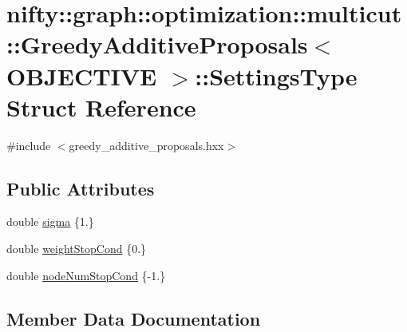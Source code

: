 \hypertarget{structnifty_1_1graph_1_1optimization_1_1multicut_1_1GreedyAdditiveProposals_1_1SettingsType}{}\section{nifty\+:\+:graph\+:\+:optimization\+:\+:multicut\+:\+:Greedy\+Additive\+Proposals$<$ O\+B\+J\+E\+C\+T\+I\+V\+E $>$\+:\+:Settings\+Type Struct Reference}
\label{structnifty_1_1graph_1_1optimization_1_1multicut_1_1GreedyAdditiveProposals_1_1SettingsType}


{\ttfamily \#include $<$greedy\+\_\+additive\+\_\+proposals.\+hxx$>$}

\subsection*{Public Attributes}
\begin{DoxyCompactItemize}
\item 
double \hyperlink{structnifty_1_1graph_1_1optimization_1_1multicut_1_1GreedyAdditiveProposals_1_1SettingsType_ac9d869a5abb42f4d2ca8a225ff7ca108}{sigma} \{1.\}
\item 
double \hyperlink{structnifty_1_1graph_1_1optimization_1_1multicut_1_1GreedyAdditiveProposals_1_1SettingsType_ac9178ee3d08c5c53f720cf2f93dd5c47}{weight\+Stop\+Cond} \{0.\}
\item 
double \hyperlink{structnifty_1_1graph_1_1optimization_1_1multicut_1_1GreedyAdditiveProposals_1_1SettingsType_ae750a2bbe36249f9535d3654b0f99bc3}{node\+Num\+Stop\+Cond} \{-\/1.\}
\end{DoxyCompactItemize}


\subsection{Member Data Documentation}
\hypertarget{structnifty_1_1graph_1_1optimization_1_1multicut_1_1GreedyAdditiveProposals_1_1SettingsType_ae750a2bbe36249f9535d3654b0f99bc3}{}
